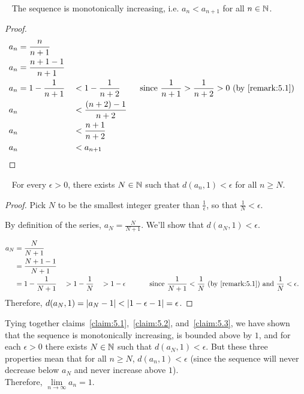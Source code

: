 \begin{answer}
  
  \begin{claim}~\label{claim:5.2}
    The sequence is monotonically increasing,
    i.e. $a_n < a_{n+1}$ for all $n \in \mathbb{N}$.
    \begin{proof}
      \begin{alignat*}{3}
        a_n &= \frac{n}{n + 1} \\
        a_n &= \frac{n + 1 - 1}{n + 1} \\
        a_n &= 1 - \frac{1}{n + 1} &&< 1 - \frac{1}{n + 2} \qquad \text{ since $\frac{1}{n+1} > \frac{1}{n+2} > 0$ (by~\ref{remark:5.1})} \\
        a_n & &&< \frac{(n + 2) - 1}{n + 2} \\
        a_n & &&< \frac{n + 1}{n + 2} \\
        a_n & &&< a_{n+1}
      \end{alignat*}
    \end{proof}
  \end{claim}
  \newpage
  \begin{claim}~\label{claim:5.3}
    For every $\epsilon > 0$, there exists $N \in \mathbb{N}$ such that $d(a_n, 1) < \epsilon$
    for all $n \geq N$.
    \begin{proof}
      Pick $N$ to be the smallest integer greater than $\frac{1}{\epsilon}$,
      so that $\frac{1}{N} < \epsilon$.

      By definition of the series, $a_N = \frac{N}{N + 1}$.
      We'll show that $d(a_N, 1) < \epsilon$.

      \begin{alignat*}{4}
        a_N &= \frac{N}{N + 1} \\
            &= \frac{N + 1 - 1}{N + 1} \\
            &= 1 - \frac{1}{N + 1}   &&> 1 - \frac{1}{N} &&> 1 - \epsilon &&\qquad \text{ since $\displaystyle \frac{1}{N+1} < \frac{1}{N}$ (by~\ref{remark:5.1}) and $\frac{1}{N} < \epsilon$.}
      \end{alignat*}
      Therefore, $d(a_N, 1) = \lvert a_N - 1\rvert < \lvert1 - \epsilon - 1\rvert = \epsilon$.
    \end{proof}
  \end{claim}

  \step
  Tying together claims~\ref{claim:5.1},~\ref{claim:5.2}, and~\ref{claim:5.3},
  we have shown that the sequence is monotonically increasing, is bounded above by $1$,
  and for each $\epsilon > 0$ there exists $N \in \mathbb{N}$ such that $d(a_N, 1) < \epsilon$.
  But these three properties mean that for all $n \geq N$, $d(a_n, 1) < \epsilon$
  (since the sequence will never decrease below $a_N$ and never increase above $1$). \\
  Therefore, $\lim\limits_{n \to \infty}{a_n} = 1$.
\end{answer}

